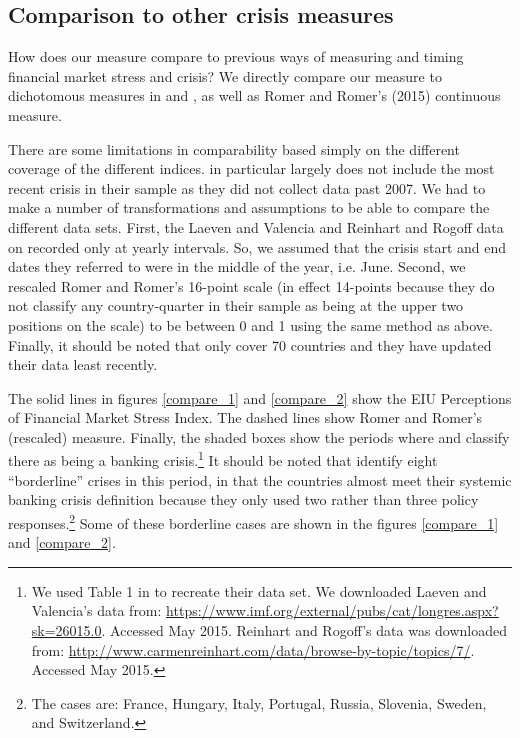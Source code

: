 \documentclass[]{article}
\begin{document}


\subsection{Comparison to other crisis
measures}\label{comparison-to-other-crisis-measures}

How does our measure compare to previous ways of measuring and timing
financial market stress and crisis? We directly compare our measure to
dichotomous measures in \cite{Reinhart2009} and \cite{laeven2013}, as well as Romer and Romer's (2015) continuous measure.

There are some limitations in comparability based simply on the
different coverage of the different indices. \cite{Romer2015}
in particular largely does not include the most recent crisis in their
sample as they did not collect data past 2007. We had to make a number
of transformations and assumptions to be able to compare the different
data sets. First, the Laeven and Valencia and Reinhart and Rogoff data
on recorded only at yearly intervals. So, we assumed that the crisis
start and end dates they referred to were in the middle of the year,
i.e. June. Second, we rescaled Romer and Romer's 16-point scale (in effect 14-points because they do not classify any country-quarter in
their sample as being at the upper two positions on the scale) to be
between 0 and 1 using the same method as above. Finally, it should be
noted that \cite{Reinhart2009} only cover 70 countries and they
have updated their data least recently.

The solid lines in figures \ref{compare_1} and \ref{compare_2} show the
EIU Perceptions of Financial Market Stress Index. The dashed lines show
Romer and Romer's (rescaled) measure. Finally, the shaded boxes show the
periods where \cite{laeven2013} and \cite{Reinhart2009} classify there as being a banking crisis.\footnote{We used Table 1 in \cite{Romer2015} to recreate their data set. We downloaded Laeven and Valencia's data from: \url{https://www.imf.org/external/pubs/cat/longres.aspx?sk=26015.0}.
  Accessed May 2015. Reinhart and Rogoff's data was downloaded from:
  \url{http://www.carmenreinhart.com/data/browse-by-topic/topics/7/}.
  Accessed May 2015.} It should be noted that \cite{laeven2013} identify eight ``borderline'' crises in this period, in that the countries almost meet their systemic banking crisis definition because they only used two rather than three policy responses.\footnote{The cases are: France, Hungary, Italy, Portugal, Russia, Slovenia, Sweden, and Switzerland.} Some of these borderline cases are shown in the figures \ref{compare_1} and \ref{compare_2}.
\end{document}
